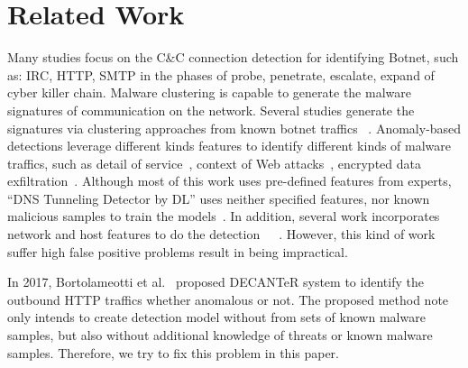 \section{Related Work}

Many studies focus on the C\&C connection detection for identifying Botnet, such as: IRC, HTTP, SMTP in the phases of probe, penetrate, escalate, expand of cyber killer chain.  Malware clustering is capable to generate the malware signatures of communication on the network.   Several studies generate the signatures via clustering approaches from known botnet traffics ~\cite{p:zarras14}.   Anomaly-based detections leverage different kinds features to identify different kinds of malware traffics, such as detail of service~\cite{p:feinstein03}, context of Web attacks~\cite{p:krugel03},  encrypted data exfiltration~\cite{p:he14}.  Although most of this work uses pre-defined features from experts,  “DNS Tunneling Detector by DL” uses neither specified features, nor  known malicious samples to train the models~\cite{j:zhang16}.  In addition, several work incorporates network and host features to do the detection~\cite{p:schwenk11}~\cite{borders2004web}~\cite{p:schwenk11}.  However, this kind of work suffer high false positive problems result in being impractical.  

In 2017, Bortolameotti et al.~\cite{bortolameotti2017decanter} proposed DECANTeR system to identify the outbound HTTP traffics whether anomalous or not.   The proposed method note only intends to create detection model without from sets of known malware samples, but also without additional knowledge of threats or known malware samples. Therefore, we try to fix this problem in this paper.